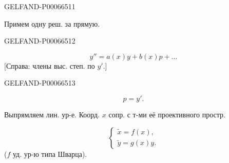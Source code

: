 \begin{GelfandAdjacentEvidence}{GELFAND-P000665}{11}


Примем одну реш. за прямую.
\end{GelfandAdjacentEvidence}
\begin{GelfandAdjacentEvidence}{GELFAND-P000665}{12}

\[
y''=a(x)y+b(x)p+\ldots
\]
[Справа: члены выс. степ. по \(y'\).]
\end{GelfandAdjacentEvidence}
\begin{GelfandAdjacentEvidence}{GELFAND-P000665}{13}

\[
p=y'.
\]

Выпрямляем лин. ур-е. Коорд. \(x\) сопр. с т-ми её проективного простр.
\end{GelfandAdjacentEvidence}

\[
\begin{cases}
\tilde x=f(x),\\
\tilde y=g(x)y.
\end{cases}
\]
(\(f\) уд. ур-ю типа Шварца).


